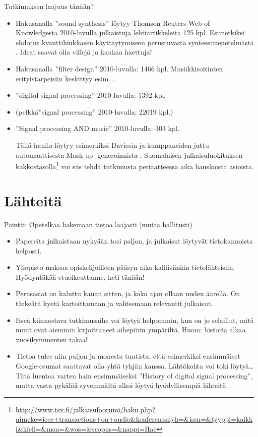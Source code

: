 \documentclass[pdf,10pt,handout]{beamer}
\begin{document}
\begin{frame}{Tutkimuksen laajuus tänään?}
  \begin{itemize}
  \item
    Hakusanalla ''sound synthesis'' löytyy Thomson Reuters Web of
    Knowledgesta 2010-luvulla julkaistuja lehtiartikkeleita 125
    kpl. Esimerkiksi ehdotus kvanttihiukkasen käyttäytymiseen
    perustuvasta synteesimenetelmästä
    \cite{CadizRamos2014quantum}. Ideat saavat olla villejä ja kaukaa
    haettuja!
  \item
    Hakusanalla ''filter design'' 2010-luvulla: 1466
    kpl. Musiikkisoitinten erityistarpeisiin keskittyy
    esim. \cite{Wishnick14timevaryingfilters}.
  \item
    ''digital signal processing'' 2010-luvulla: 1392 kpl.
  \item
    (pelkkä''signal processing'' 2010-luvulla: 22019 kpl.)
  \item
    ''Signal processing AND music'' 2010-luvulla: 303 kpl.
    
    Tällä haulla löytyy esimerkiksi Daviesin ja kumppaneiden juttu
    automaattisesta Mash-up -generoinnista
    \cite{daviesEtal2014automashupper}. Suomalaisen
    julkaisuluokituksen
    kakkostasolla\footnote{{\tiny \url{http://www.tsv.fi/julkaisufoorumi/haku.php?nimeke=ieee+transactions+on+audio&konferenssilyh=&issn=&tyyppi=kaikki&kieli=&maa=&wos=&scopus=&nappi=Hae}}}
    voi siis tehdä tutkimusta periaatteessa aika hauskoista asioista.

  \end{itemize}
\end{frame}


\section{Lähteitä}

\begin{frame}{Pointti: Opetelkaa hakemaan tietoa laajasti (mutta hallitusti)}
  \begin{itemize}
  \item
    Papereita julkaistaan nykyään tosi paljon, ja julkaisut löytyvät
    tietokannoista helposti. 
  \item Yliopisto maksaa opiskelijoilleen pääsyn aika kalliisiinkin
    tietolähteisiin. Hyödyntäkää etuoikeuttanne, heti tänään!
  \item Perusasiat on kaluttu kauan sitten, ja
    koko ajan ollaan uuden äärellä. On tärkeätä kyetä kartoittamaan ja
    valitsemaan relevantit julkaisut.
  \item Itseä kiinnostava tutkimusaihe voi löytyä helpommin, kun on jo
    selaillut, mitä muut ovat aiemmin kirjoittaneet aihepiirin
    ympäriltä. Huom: historia alkaa vuosikymmenten takaa!
  \item Tietoa tulee niin paljon ja monesta tuutista, että esimerkiksi
    ensimmäiset Google-osumat saattavat olla yhtä tyhjän
    kanssa. Lähtökohta voi toki löytyä\ldots Tätä luentoa varten hain
    ensimmäiseksi ''History of digital signal processing'', mutta
    vasta pykälää syvemmältä alkoi löytyä hyödyllisempiä lähteitä.
  \end{itemize}
\end{frame}
\end{document}
